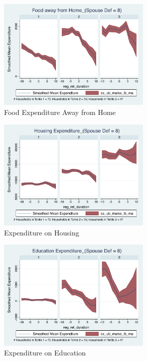\documentclass[11pt,onecolumn]{article}
\numberwithin{figure}{section}
\begin{document}
\begin{figure}[h]
	\caption{Food Expenditure Away from Home}
	\centering
	\includegraphics[width=0.65\textwidth]{../ConsumptionPostRetirement_by_SpouseDef_Cats/Smoothed/8/spouse_def_total_foodexp_away_real.pdf}
\end{figure}

\clearpage

\begin{figure}[h]
	\caption{Expenditure on Housing}
	\centering
	\includegraphics[width=0.65\textwidth]{../ConsumptionPostRetirement_by_SpouseDef_Cats/Smoothed/8/spouse_def_total_housing_real.pdf}
\end{figure}


\begin{figure}[h]
	\caption{Expenditure on Education}
	\centering
	\includegraphics[width=0.65\textwidth]{../ConsumptionPostRetirement_by_SpouseDef_Cats/Smoothed/8/spouse_def_total_education_real.pdf}
\end{figure}
\clearpage
\end{document}
